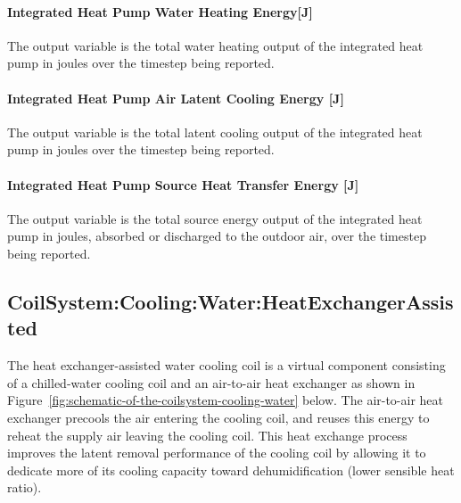 \paragraph{Integrated Heat Pump Water Heating Energy{[}J{]}}\label{Out-Total-WH-Energy-ASIHP}
The output variable is the total water heating output of the integrated heat pump in joules over the timestep being reported. 


\paragraph{Integrated Heat Pump Air Latent Cooling Energy {[}J{]}}\label{Out-Total-LatCooling-Energy-ASIHP}
The output variable is the total latent cooling output of the integrated heat pump in joules over the timestep being reported.

\paragraph{Integrated Heat Pump Source Heat Transfer Energy {[}J{]}}\label{Out-Total-Source-Energy-ASIHP}
The output variable is the total source energy output of the integrated heat pump in joules, absorbed or discharged to the outdoor air, over the timestep being reported.



\subsection{CoilSystem:Cooling:Water:HeatExchangerAssisted}\label{coilsystemcoolingwaterheatexchangerassisted}

The heat exchanger-assisted water cooling coil is a virtual component consisting of a chilled-water cooling coil and an air-to-air heat exchanger as shown in Figure~\ref{fig:schematic-of-the-coilsystem-cooling-water} below. The air-to-air heat exchanger precools the air entering the cooling coil, and reuses this energy to reheat the supply air leaving the cooling coil. This heat exchange process improves the latent removal performance of the cooling coil by allowing it to dedicate more of its cooling capacity toward dehumidification (lower sensible heat ratio).

